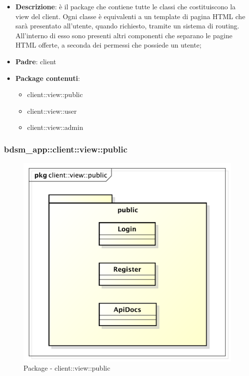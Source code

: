 	\begin{itemize}
		\item \textbf{Descrizione}: è il package che contiene tutte le classi che costituiscono la view del client. Ogni classe è equivalenti a un template di pagina HTML che sarà presentato all'utente, quando richiesto, tramite un sistema di routing. \newline
		All'interno di esso sono presenti altri componenti che separano le pagine HTML offerte, a seconda dei permessi che possiede un utente;
		\item \textbf{Padre}: client
		\item \textbf{Package contenuti}:
			\begin{itemize}
				\item client::view::public
				\item client::view::user
				\item client::view::admin
			\end{itemize}
	\end{itemize}

	\pagebreak

	\subsubsection{bdsm\_app::client::view::public} %
	\label{ssub:bdsm_app_client_view_public}
	\begin{figure}[htbp]
		\centering
		\centerline{\includegraphics[scale=0.6]{./images/client_view_public.pdf}}
		\caption{Package - client::view::public}
	\end{figure}

